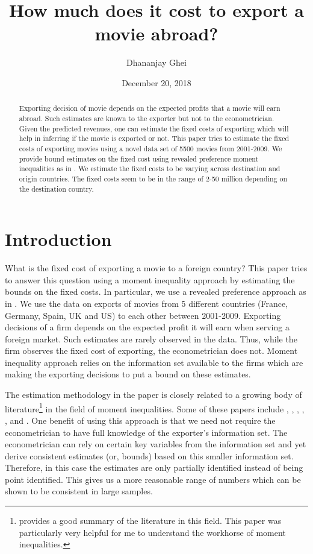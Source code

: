 \documentclass[11pt, letterpaper]{article} \usepackage{amsmath}
\title{How much does it cost to export a movie abroad?} \author{Dhananjay Ghei} \date{December 20, 2018}
\begin{document}
\maketitle
\begin{abstract}
Exporting decision of movie depends on the expected profits that a
movie will earn abroad. Such estimates are known to the exporter but
not to the econometrician. Given the predicted revenues, one can
estimate the fixed costs of exporting which will help in inferring if
the movie is exported or not. This paper tries to estimate the fixed
costs of exporting movies using a novel data set of 5500 movies from
2001-2009. We provide bound estimates on the fixed cost using revealed
preference moment inequalities as in \citet{pakes2015}. We estimate
the fixed costs to be varying across destination and origin
countries. The fixed costs seem to be in the range of 2-50 million
depending on the destination country.
\end{abstract}
\newpage
\tableofcontents
\newpage
\section{Introduction}
What is the fixed cost of exporting a movie to a foreign country? This
paper tries to answer this question using a moment inequality approach
by estimating the bounds on the fixed costs. In particular, we use a
revealed preference approach as in \citep{pakes2015}. We use the data
on exports of movies from 5 different countries (France, Germany,
Spain, UK and US) to each other between 2001-2009.  Exporting
decisions of a firm depends on the expected profit it will earn when
serving a foreign market. Such estimates are rarely observed in the
data. Thus, while the firm observes the fixed cost of exporting, the
econometrician does not. Moment inequality approach relies on the
information set available to the firms which are making the exporting
decisions to put a bound on these estimates.

The estimation methodology in the paper is closely related to a
growing body of literature\footnote{\citep{tamer2010} provides a good
  summary of the literature in this field. This paper was particularly
  very helpful for me to understand the workhorse of moment
  inequalities.} in the field of moment inequalities. Some of these
papers include \citet{chernozhukov2013}, \citet{manski2004},
\citet{pakes2010}, \citet{andrews2010}, \citet{holmes2011},
\citet{ho2009} and \citet{sweeting2013}. One benefit of using this
approach is that we need not require the econometrician to have full
knowledge of the exporter's information set. The econometrician can
rely on certain key variables from the information set and yet derive
consistent estimates (or, bounds) based on this smaller information
set. Therefore, in this case the estimates are only partially
identified instead of being point identified. This gives us a more
reasonable range of numbers which can be shown to be consistent in
large samples.
\end{document}
